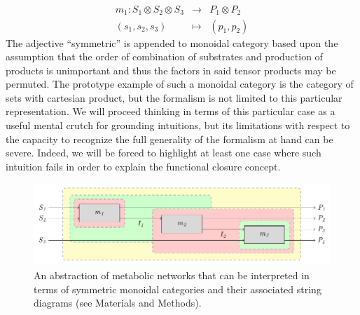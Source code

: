 \begin{eqnarray*}
m_1 \colon S_1 \otimes S_2 \otimes S_3 &\longrightarrow& P_1 \otimes P_2\\
(s_1,s_2,s_3) &\longmapsto& (p_1,p_2)
\end{eqnarray*}
The adjective ``symmetric'' is appended to monoidal category based upon the assumption that the order of combination of substrates and production of products is unimportant and thus the factors in said tensor products may be permuted. The prototype example of such a monoidal category is the category of sets with cartesian product, but the formalism is not limited to this particular representation. We will proceed thinking in terms of this particular case as a useful mental crutch for grounding intuitions, but its limitations with respect to the capacity to recognize the full generality of the formalism at hand can be severe. Indeed, we will be forced to highlight at least one case where such intuition fails in order to explain the functional closure concept.

\begin{figure}
\begin{center}
\noindent\includegraphics[width=0.9\columnwidth]{fig/blockdiagtop.pdf}
\end{center}
\caption{An abstraction of metabolic networks that can be interpreted in terms of symmetric monoidal categories and their associated string diagrams (see Materials and Methods).}
\label{fig:metabolicstringdiag}
\end{figure}

